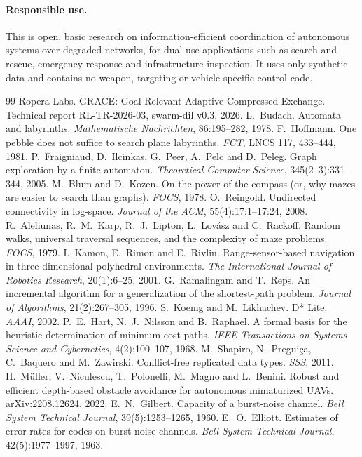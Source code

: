 \documentclass[11pt,a4paper]{article}
\begin{document}
\paragraph{Responsible use.} This is open, basic research on information-efficient coordination of autonomous systems
over degraded networks, for dual-use applications such as search and rescue, emergency response and infrastructure
inspection. It uses only synthetic data and contains no weapon, targeting or vehicle-specific control code.

\begin{thebibliography}{99}\small
{} Ropera Labs. GRACE: Goal-Relevant Adaptive Compressed Exchange. Technical report RL-TR-2026-03,
swarm-dil v0.3, 2026.
 L.~Budach. Automata and labyrinths. \emph{Mathematische Nachrichten}, 86:195--282, 1978.
 F.~Hoffmann. One pebble does not suffice to search plane labyrinths. \emph{FCT}, LNCS 117,
433--444, 1981.
 P.~Fraigniaud, D.~Ilcinkas, G.~Peer, A.~Pelc and D.~Peleg. Graph exploration by a finite automaton.
\emph{Theoretical Computer Science}, 345(2--3):331--344, 2005.
 M.~Blum and D.~Kozen. On the power of the compass (or, why mazes are easier to search than
graphs). \emph{FOCS}, 1978.
 O.~Reingold. Undirected connectivity in log-space. \emph{Journal of the ACM}, 55(4):17:1--17:24,
2008.
 R.~Aleliunas, R.~M.~Karp, R.~J.~Lipton, L.~Lov\'asz and C.~Rackoff. Random walks, universal
traversal sequences, and the complexity of maze problems. \emph{FOCS}, 1979.
 I.~Kamon, E.~Rimon and E.~Rivlin. Range-sensor-based navigation in three-dimensional polyhedral
environments. \emph{The International Journal of Robotics Research}, 20(1):6--25, 2001.
 G.~Ramalingam and T.~Reps. An incremental algorithm for a generalization of the shortest-path problem.
\emph{Journal of Algorithms}, 21(2):267--305, 1996.
 S.~Koenig and M.~Likhachev. D* Lite. \emph{AAAI}, 2002.
 P.~E.~Hart, N.~J.~Nilsson and B.~Raphael. A formal basis for the heuristic determination of minimum
cost paths. \emph{IEEE Transactions on Systems Science and Cybernetics}, 4(2):100--107, 1968.
 M.~Shapiro, N.~Pregui\c{c}a, C.~Baquero and M.~Zawirski. Conflict-free replicated data types.
\emph{SSS}, 2011.
 H.~M\"uller, V.~Niculescu, T.~Polonelli, M.~Magno and L.~Benini. Robust and efficient depth-based
obstacle avoidance for autonomous miniaturized UAVs. arXiv:2208.12624, 2022.
 E.~N.~Gilbert. Capacity of a burst-noise channel. \emph{Bell System Technical Journal},
39(5):1253--1265, 1960.
 E.~O.~Elliott. Estimates of error rates for codes on burst-noise channels. \emph{Bell System
Technical Journal}, 42(5):1977--1997, 1963.
\end{thebibliography}
\end{document}
